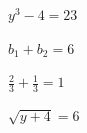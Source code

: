 \documentclass[12pt]{article}
\newcommand{\sample}[1]{\vspace*{\fill}\centerline{$\displaystyle #1$}\vspace*{\fill}\newpage}
\begin{document}
\sample{y^{3}-4=23}
\sample{b_{1}+b_{2}=6}
\sample{\frac{2}{3}+\frac{1}{3}=1}
\sample{\sqrt{y+4}=6}
\end{document}
